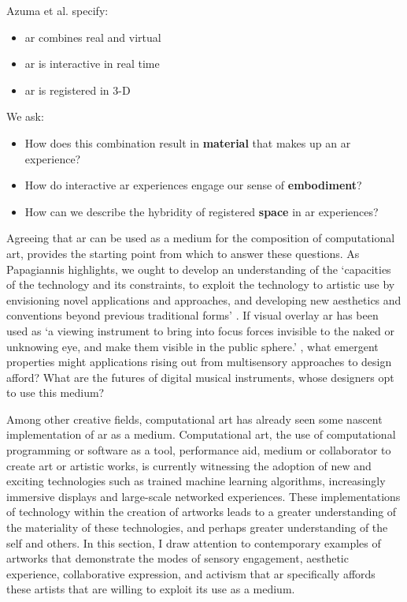 Azuma et al. specify:
\begin{itemize}
    \item \gls{ar} combines real and virtual
    \item \gls{ar} is interactive in real time
    \item \gls{ar} is registered in 3-D
\end{itemize}
We ask:
\begin{itemize}
    \item How does this combination result in \textbf{material} that makes up an \gls{ar} experience?
    \item How do interactive \gls{ar} experiences engage our sense of \textbf{embodiment}?
    \item How can we describe the hybridity of registered \textbf{space} in \gls{ar} experiences?
\end{itemize}

Agreeing that \gls{ar} can be used as a medium for the composition of computational art, provides the starting point from which to answer these questions. As Papagiannis highlights, we ought to develop an understanding of the `capacities of the technology and its constraints, to exploit the technology to artistic use by envisioning novel applications and approaches, and developing new aesthetics and conventions beyond previous traditional forms' \citeyearpar{papagiannis2017}. If visual overlay \gls{ar} has been used as `a viewing instrument to bring into focus forces invisible to the naked or unknowing eye, and make them visible in the public sphere.' \citep{thiel2011}, what emergent properties might applications rising out from multisensory approaches to design afford? What are the futures of digital musical instruments, whose designers opt to use this medium? 

Among other creative fields, computational art has already seen some nascent implementation of \gls{ar} as a medium. Computational art, the use of computational programming or software as a tool, performance aid, medium or collaborator to create art or artistic works, is currently witnessing the adoption of new and exciting technologies such as trained machine learning algorithms, increasingly immersive displays and large-scale networked experiences. These implementations of technology within the creation of artworks leads to a greater understanding of the materiality of these technologies, and perhaps greater understanding of the self and others. In this section, I draw attention to contemporary examples of artworks that demonstrate the modes of sensory engagement, aesthetic experience, collaborative expression, and activism that \gls{ar} specifically affords these artists that are willing to exploit its use as a medium.


